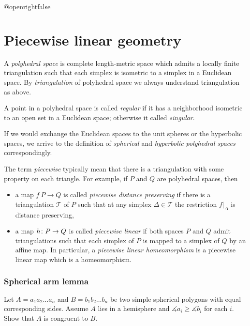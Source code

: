 \csname @openrightfalse\endcsname
\chapter{Piecewise linear geometry}


A \emph{polyhedral space} is complete length-metric space which admits a locally finite triangulation 
such that each simplex is isometric to a simplex in a Euclidean space.
By {}\emph{triangulation} of polyhedral space we always understand triangulation as above. 

A point in a polyhedral space is called \emph{regular} if it has a neighborhood isometric to an open set in a Euclidean space;
otherwise it called {}\emph{singular}.

If we would exchange the Euclidean spaces to the unit spheres or the hyperbolic spaces,
we arrive to the definition of {}\emph{spherical} and {}\emph{hyperbolic polyhedral spaces} correspondingly.

The term \emph{piecewise} typically mean that there is a triangulation with some property on each triangle.
For example,  if $P$ and $Q$ are polyhedral spaces, then
\begin{itemize}
\item a map $f\:P\to Q$ is called {}\emph{piecewise distance preserving} if there is a triangulation $\mathcal{T}$ of $P$ such that at any simplex $\Delta\in \mathcal{T}$ the restriction $f|_\Delta$ is distance preserving,
\item a map $h\:P\z\to Q$  is called {}\emph{piecewise linear} if both spaces $P$ and $Q$ admit triangulations such that each simplex of $P$ is mapped to a simplex of $Q$ by an affine map.
In particular, a {}\emph{piecewise linear homeomorphism} is a piecewise linear map which is a homeomorphism.\label{piecewise linear map}
\end{itemize}





\subsection*{Spherical arm lemma}\label{Spherical arm lemma}

\begin{pr}
Let $A=a_1a_2\dots a_n$ and $B=b_1b_2\dots b_n$ be two simple spherical polygons 
with equal corresponding sides.
Assume $A$ lies in a hemisphere and $\measuredangle a_i\ge\measuredangle b_i$ for each $i$.
Show that $A$ is congruent to $B$.
\end{pr}

